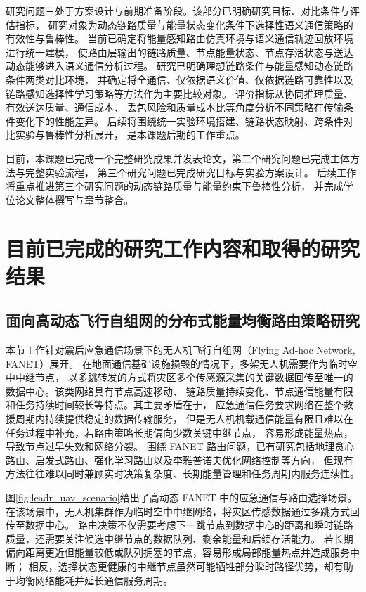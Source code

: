 研究问题三处于方案设计与前期准备阶段。该部分已明确研究目标、对比条件与评估指标，
研究对象为动态链路质量与能量状态变化条件下选择性语义通信策略的有效性与鲁棒性。
当前已确定将能量感知路由仿真环境与语义通信轨迹回放环境进行统一建模，
使路由层输出的链路质量、节点能量状态、节点存活状态与送达动态能够进入语义通信分析过程。
研究已明确理想链路条件与能量感知动态链路条件两类对比环境，
并确定将全通信、仅依据语义价值、仅依据链路可靠性以及链路感知选择性学习策略等方法作为主要比较对象。
评价指标从协同推理质量、有效送达质量、通信成本、
丢包风险和质量成本比等角度分析不同策略在传输条件变化下的性能差异。
后续将围绕统一实验环境搭建、链路状态映射、跨条件对比实验与鲁棒性分析展开，
是本课题后期的工作重点。

目前，本课题已完成一个完整研究成果并发表论文，第二个研究问题已完成主体方法与完整实验流程，
第三个研究问题已完成研究目标与实验方案设计。
后续工作将重点推进第三个研究问题的动态链路质量与能量约束下鲁棒性分析，
并完成学位论文整体撰写与章节整合。

\section{目前已完成的研究工作内容和取得的研究结果}

\subsection{面向高动态飞行自组网的分布式能量均衡路由策略研究}
本节工作针对震后应急通信场景下的无人机飞行自组网（Flying Ad-hoc Network, FANET）展开。
在地面通信基础设施损毁的情况下，多架无人机需要作为临时空中中继节点，
以多跳转发的方式将灾区多个传感源采集的关键数据回传至唯一的数据中心。该类网络具有节点高速移动、
链路质量持续变化、节点通信能量有限和任务持续时间较长等特点。其主要矛盾在于，
应急通信任务要求网络在整个救援周期内持续提供稳定的数据传输服务，
但是无人机机载通信能量有限且难以在任务过程中补充，若路由策略长期偏向少数关键中继节点，
容易形成能量热点，导致节点过早失效和网络分裂。
围绕 FANET 路由问题，已有研究包括地理贪心路由、启发式路由、强化学习路由以及李雅普诺夫优化网络控制等方向，
但现有方法往往难以同时兼顾实时决策复杂度、长期能量管理和任务周期内服务连续性。

图\ref{fig:leadr_uav_scenario}给出了高动态 FANET 中的应急通信与路由选择场景。
在该场景中，无人机集群作为临时空中中继网络，将灾区传感数据通过多跳方式回传至数据中心。
路由决策不仅需要考虑下一跳节点到数据中心的距离和瞬时链路质量，还需要关注候选中继节点的数据队列、剩余能量和后续存活能力。
若长期偏向距离更近但能量较低或队列拥塞的节点，容易形成局部能量热点并造成服务中断；
相反，选择状态更健康的中继节点虽然可能牺牲部分瞬时路径优势，却有助于均衡网络能耗并延长通信服务周期。

